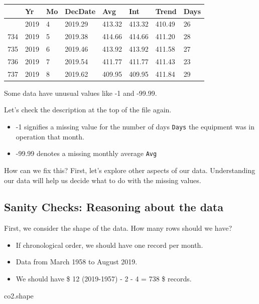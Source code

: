 \documentclass[
  letterpaper,
  DIV=11,
  numbers=noendperiod]{scrreprt}
\newenvironment{Shaded}{\begin{snugshade}}{\end{snugshade}}
\newcommand{\NormalTok}[1]{\textcolor[rgb]{0.00,0.23,0.31}{#1}}
\providecommand{\tightlist}{%
  \setlength{\itemsep}{0pt}\setlength{\parskip}{0pt}}\usepackage{longtable,booktabs,array}
\begin{document}
\begin{longtable}[]{@{}llllllll@{}}
\toprule\noalign{}
& Yr & Mo & DecDate & Avg & Int & Trend & Days \\
\midrule\noalign{}
\endhead
\bottomrule\noalign{}
\endlastfoot
733 & 2019 & 4 & 2019.29 & 413.32 & 413.32 & 410.49 & 26 \\
734 & 2019 & 5 & 2019.38 & 414.66 & 414.66 & 411.20 & 28 \\
735 & 2019 & 6 & 2019.46 & 413.92 & 413.92 & 411.58 & 27 \\
736 & 2019 & 7 & 2019.54 & 411.77 & 411.77 & 411.43 & 23 \\
737 & 2019 & 8 & 2019.62 & 409.95 & 409.95 & 411.84 & 29 \\
\end{longtable}

Some data have unusual values like -1 and -99.99.

Let's check the description at the top of the file again.

\begin{itemize}
\tightlist
\item
  -1 signifies a missing value for the number of days \texttt{Days} the
  equipment was in operation that month.
\item
  -99.99 denotes a missing monthly average \texttt{Avg}
\end{itemize}

How can we fix this? First, let's explore other aspects of our data.
Understanding our data will help us decide what to do with the missing
values.

\subsection{Sanity Checks: Reasoning about the
data}\label{sanity-checks-reasoning-about-the-data}

First, we consider the shape of the data. How many rows should we have?

\begin{itemize}
\tightlist
\item
  If chronological order, we should have one record per month.
\item
  Data from March 1958 to August 2019.
\item
  We should have \$ 12 \times (2019-1957) - 2 - 4 = 738 \$ records.
\end{itemize}

\begin{Shaded}
\begin{Highlighting}[]
\NormalTok{co2.shape}
\end{Highlighting}
\end{Shaded}
\end{document}
